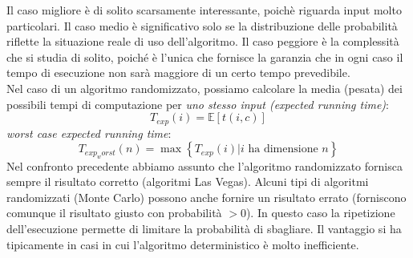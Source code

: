 \documentclass[12pt]{article}
\begin{document}
Il caso migliore è di solito scarsamente interessante, poichè riguarda input molto particolari. Il caso medio è significativo solo se la distribuzione delle probabilità riflette la situazione reale di uso dell'algoritmo. Il caso peggiore è la complessità che si studia di solito, poiché è l'unica che fornisce la garanzia che in ogni caso il tempo di esecuzione non sarà maggiore di un certo tempo prevedibile.\\
Nel caso di un algoritmo randomizzato, possiamo calcolare la media (pesata) dei possibili tempi di computazione per \textit{uno stesso input (expected running time)}:
\begin{equation}
    T_{exp}(i) = \mathbb{E}\left[t(i,c)\right]
\end{equation}
\textit{worst case expected running time}:
\begin{equation}
    T_{exp_worst}(n) = \max\left\{T_{exp}(i)|i \text{ ha dimensione }n\right\}
\end{equation}
Nel confronto precedente abbiamo assunto che l'algoritmo randomizzato fornisca sempre il risultato corretto (algoritmi Las Vegas). Alcuni tipi di algoritmi randomizzati (Monte Carlo) possono anche fornire un risultato errato (forniscono comunque il risultato giusto con probabilità \(> 0\)). In questo caso la ripetizione dell'esecuzione permette di limitare la probabilità di sbagliare. Il vantaggio si ha tipicamente in casi in cui l'algoritmo deterministico è molto inefficiente.
\end{document}
